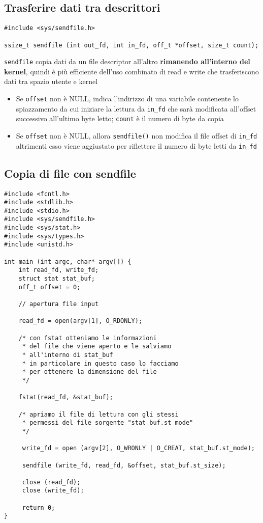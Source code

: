 \documentclass[italian,12pt,a4paper]{article}
\begin{document}
\subsection{Trasferire dati tra descrittori}
\begin{lstlisting}[xleftmargin=-1cm]
#include <sys/sendfile.h>

ssize_t sendfile (int out_fd, int in_fd, off_t *offset, size_t count);
\end{lstlisting}
\verb|sendfile| copia dati da un file descriptor all'altro \textbf{rimanendo all'interno del kernel}, quindi è più efficiente dell'uso combinato di read e write che trasferiscono dati tra spazio utente e kernel
\begin{itemize}
	\item Se \verb|offset| non è NULL, indica l'indirizzo di una variabile contenente lo spiazzamento da cui iniziare la lettura da \verb|in_fd| che sarà modificata all'offset successivo all'ultimo byte letto; \verb|count| è il numero di byte da copia
	\item Se \verb|offset| non è NULL, allora \verb|sendfile()| non modifica il file offset di \verb|in_fd| altrimenti esso viene aggiustato per riflettere il numero di byte letti da \verb|in_fd|
\end{itemize}
\subsection{Copia di file con sendfile}
\begin{lstlisting}[xleftmargin=-1.5 cm]
#include <fcntl.h>
#include <stdlib.h>
#include <stdio.h>
#include <sys/sendfile.h>
#include <sys/stat.h>
#include <sys/types.h>
#include <unistd.h>

int main (int argc, char* argv[]) {
	int read_fd, write_fd;
	struct stat stat_buf;
	off_t offset = 0;
	
	// apertura file input
	
	read_fd = open(argv[1], O_RDONLY);
	
	/* con fstat otteniamo le informazioni
	 * del file che viene aperto e le salviamo
	 * all'interno di stat_buf
	 * in particolare in questo caso lo facciamo
	 * per ottenere la dimensione del file
	 */
	
	fstat(read_fd, &stat_buf);
	
	/* apriamo il file di lettura con gli stessi
	 * permessi del file sorgente "stat_buf.st_mode"
	 */
	 
	 write_fd = open (argv[2], O_WRONLY | O_CREAT, stat_buf.st_mode);
	 
	 sendfile (write_fd, read_fd, &offset, stat_buf.st_size);
	 
	 close (read_fd);
	 close (write_fd);
	 
	 return 0;
}
\end{lstlisting}
\end{document}
